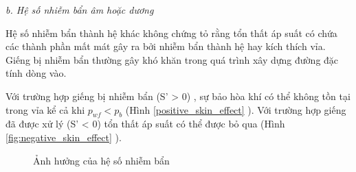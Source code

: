 \documentclass[12pt,a4paper]{report}
\begin{document}
\textit{b. Hệ số nhiễm bẩn âm hoặc dương}

Hệ số nhiễm bẩn thành hệ khác không chứng tỏ rằng tổn thất áp suất có chứa các thành phần mất mát gây ra bởi nhiễm bẩn thành hệ hay kích thích vỉa. Giếng bị nhiễm bẩn thường gây khó khăn trong quá trình xây dựng đường đặc tính dòng vào.

Với trường hợp giếng bị nhiễm bẩn (S' > 0) , sự bảo hòa khí có thể không tồn tại trong vỉa kể cả khi $p_{wf} < p_b$ (Hình \ref{positive_skin_effect} \cite{dale1991production}). Với trường hợp giếng đã được xử lý (S' < 0) tổn thất áp suất có thể được bỏ qua (Hình \ref{fig:negative_skin_effect} \cite{dale1991production}).
	\begin{figure}[h]
		\centering
		\hfill
		\hfill
		\caption{Ảnh hưởng của hệ số nhiễm bẩn}
	\end{figure}
\end{document}
